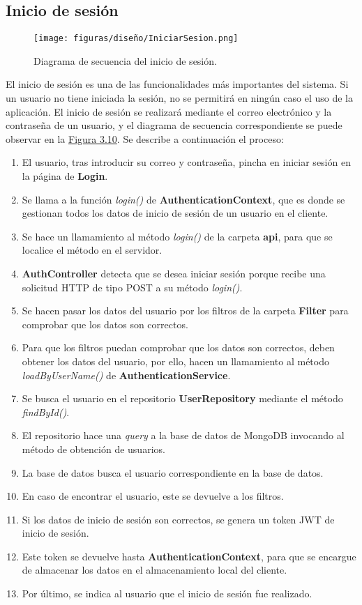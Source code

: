 \subsection{Inicio de sesión}

\begin{figure}[H]
\centerline{\texttt{[image: figuras/diseño/IniciarSesion.png]}}
\caption{Diagrama de secuencia del inicio de sesión.}
\label{enlaceDInicioSesionCuerpo}
\end{figure}

El inicio de sesión es una de las funcionalidades más importantes del sistema. Si un usuario no tiene iniciada la sesión, no se permitirá en ningún caso el uso de la aplicación. El inicio de sesión se realizará mediante el correo electrónico y la contraseña de un usuario, y el diagrama de secuencia correspondiente se puede observar en la \hyperref[enlaceDInicioSesionCuerpo]{Figura 3.10}. Se describe a continuación el proceso:

\begin{enumerate}
    \item El usuario, tras introducir su correo y contraseña, pincha en iniciar sesión en la página de {\bf Login}.
    \item Se llama a la función {\it login()} de {\bf AuthenticationContext}, que es donde se gestionan todos los datos de inicio de sesión de un usuario en el cliente.
    \item Se hace un llamamiento al método {\it login()} de la carpeta {\bf api}, para que se localice el método en el servidor.
    \item {\bf AuthController} detecta que se desea iniciar sesión porque recibe una solicitud HTTP de tipo POST a su método {\it login()}.
    \item Se hacen pasar los datos del usuario por los filtros de la carpeta {\bf Filter} para comprobar que los datos son correctos.
    \item Para que los filtros puedan comprobar que los datos son correctos, deben obtener los datos del usuario, por ello, hacen un llamamiento al método {\it loadByUserName()} de {\bf AuthenticationService}.
    \item Se busca el usuario en el repositorio {\bf UserRepository} mediante el método {\it findById()}.
    \item El repositorio hace una {\it query} a la base de datos de MongoDB invocando al método de obtención de usuarios.
    \item La base de datos busca el usuario correspondiente en la base de datos.
    \item En caso de encontrar el usuario, este se devuelve a los filtros.
    \item Si los datos de inicio de sesión son correctos, se genera un token JWT de inicio de sesión.
    \item Este token se devuelve hasta {\bf AuthenticationContext}, para que se encargue de almacenar los datos en el almacenamiento local del cliente.
    \item Por último, se indica al usuario que el inicio de sesión fue realizado.
\end{enumerate}